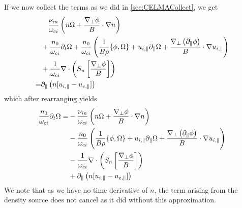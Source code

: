 %
If we now collect the terms as we did in \cref{sec:CELMACollect}, we get
%
\begin{align*}
  &
  \quad
 \frac{\nu_{in}}{\omega_{ci}} \left(n\Omega + \frac{\nabla_\perp \phi}{B} \cdot \nabla n\right)
  \\
 &
 + \frac{n_0}{\omega_{ci}}\partial_t\Omega
 + \frac{n_0}{\omega_{ci}}
 \left(
 \frac{1}{B\rho}\{\phi, \Omega\}
 + u_{i,\|}\partial_\|\Omega
 + \frac{\nabla_\perp\left( \partial_\|\phi\right)}{B}\cdot\nabla u_{i,\|}
 \right)
 \\
 &
 + \frac{1}{\omega_{ci}}
    \nabla\cdot \left( S_n \left[ \frac{ \nabla_\perp \phi }{ B } \right] \right)
 \\
 =&
 \partial_\| \left(n [u_{i,\|} - u_{e,\|}]\right)
\end{align*}
%
which after rearranging yields
%
\begin{align*}
 \frac{n_0}{\omega_{ci}}\partial_t\Omega
 =&
 - \frac{\nu_{in}}{\omega_{ci}} \left(n\Omega + \frac{\nabla_\perp \phi}{B} \cdot \nabla n\right)
  \\
 &- \frac{n_0}{\omega_{ci}}
 \left( \frac{1}{B\rho}\{\phi, \Omega\}
    + u_{i,\|}\partial_\|\Omega
    + \frac{\nabla_\perp\left( \partial_\|\phi\right)}{B}\cdot\nabla u_{i,\|}
 \right)
 \\
 &
 - \frac{1}{\omega_{ci}}
    \nabla\cdot \left( S_n \left[ \frac{ \nabla_\perp \phi }{ B } \right] \right)
 \\
 &
 + \partial_\| \left(n [u_{i,\|} - u_{e,\|}]\right)
\end{align*}
%
We note that as we have no time derivative of $n$, the term arising from the density source does not cancel as it did without this approximation.
%
